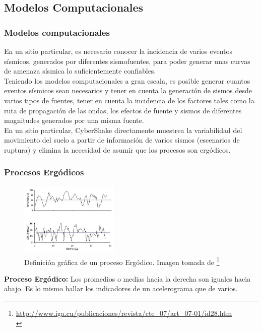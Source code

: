 \documentclass{beamer}
\begin{document}
\subsection{Modelos Computacionales}
\begin{frame}%
\frametitle{Modelos computacionales}
%
\justifying
%
En un sitio particular, es necesario conocer la incidencia de varios eventos sísmicos, generados por diferentes sismofuentes, para poder generar unas curvas de amenaza sísmica lo suficientemente confiables.\\
%
Teniendo los modelos computacionales a gran escala, es posible generar cuantos eventos sísmicos sean necesarios y tener en cuenta la generación de sismos desde varios tipos de fuentes, tener en cuenta la incidencia de los factores tales como la ruta de propagación de las ondas, los efectos de fuente y sismos de diferentes magnitudes generados por una misma fuente.\\
%
En un sitio particular, CyberShake directamente muestrea la variabilidad del movimiento del suelo a partir de información de varios sismos (escenarios de ruptura) y elimina la necesidad de asumir que los procesos son ergódicos.\\
%
\end{frame}
%
%
\begin{frame}%
\frametitle{Procesos Ergódicos}
%
\justifying
%
\begin{figure}[h]
	\centering
	\includegraphics[height=3.5cm]{img/Ergodico.pdf}
	\caption{Definición gráfica de un proceso Ergódico. Imagen tomada de \footnote{\tiny \url{http://www.iga.cu/publicaciones/revista/cte_07/art_07-01/id28.htm}\\}}
\end{figure}
%
\textbf{Proceso Ergódico:} Los promedios o medias hacia la derecha son iguales hacia abajo. Es lo mismo hallar los indicadores de un acelerograma que de varios.\\
%
\end{frame}
%
%
\end{document}
